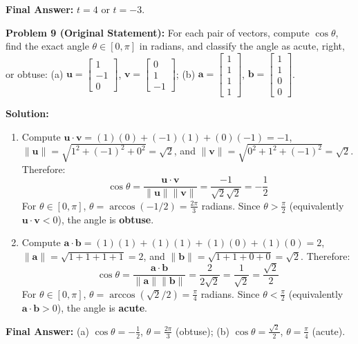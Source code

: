 \documentclass[11pt, letterpaper]{article}
\theoremstyle{definition}
\theoremstyle{remark}
\begin{document}
\textbf{Final Answer:} $t = 4$ or $t = -3$.

\medskip
\textbf{Problem 9 (Original Statement):} For each pair of vectors, compute $\cos\theta$, find the exact angle $\theta \in [0, \pi]$ in radians, and classify the angle as acute, right, or obtuse: (a) $\mathbf{u} = \begin{bmatrix} 1 \\ -1 \\ 0 \end{bmatrix}$, $\mathbf{v} = \begin{bmatrix} 0 \\ 1 \\ -1 \end{bmatrix}$; (b) $\mathbf{a} = \begin{bmatrix} 1 \\ 1 \\ 1 \\ 1 \end{bmatrix}$, $\mathbf{b} = \begin{bmatrix} 1 \\ 1 \\ 0 \\ 0 \end{bmatrix}$.

\textbf{Solution:}
\begin{enumerate}[label=(\alph*)]
    \item Compute $\mathbf{u} \cdot \mathbf{v} = (1)(0) + (-1)(1) + (0)(-1) = -1$, $\|\mathbf{u}\| = \sqrt{1^2 + (-1)^2 + 0^2} = \sqrt{2}$, and $\|\mathbf{v}\| = \sqrt{0^2 + 1^2 + (-1)^2} = \sqrt{2}$. Therefore:
    \[
    \cos\theta = \frac{\mathbf{u} \cdot \mathbf{v}}{\|\mathbf{u}\|\|\mathbf{v}\|} = \frac{-1}{\sqrt{2}\sqrt{2}} = -\frac{1}{2}
    \]
    For $\theta \in [0, \pi]$, $\theta = \arccos(-1/2) = \frac{2\pi}{3}$ radians. Since $\theta > \frac{\pi}{2}$ (equivalently $\mathbf{u} \cdot \mathbf{v} < 0$), the angle is \textbf{obtuse}.
    \item Compute $\mathbf{a} \cdot \mathbf{b} = (1)(1) + (1)(1) + (1)(0) + (1)(0) = 2$, $\|\mathbf{a}\| = \sqrt{1+1+1+1} = 2$, and $\|\mathbf{b}\| = \sqrt{1+1+0+0} = \sqrt{2}$. Therefore:
    \[
    \cos\theta = \frac{\mathbf{a} \cdot \mathbf{b}}{\|\mathbf{a}\|\|\mathbf{b}\|} = \frac{2}{2\sqrt{2}} = \frac{1}{\sqrt{2}} = \frac{\sqrt{2}}{2}
    \]
    For $\theta \in [0, \pi]$, $\theta = \arccos(\sqrt{2}/2) = \frac{\pi}{4}$ radians. Since $\theta < \frac{\pi}{2}$ (equivalently $\mathbf{a} \cdot \mathbf{b} > 0$), the angle is \textbf{acute}.
\end{enumerate}
\textbf{Final Answer:} (a) $\cos\theta = -\frac{1}{2}$, $\theta = \frac{2\pi}{3}$ (obtuse); (b) $\cos\theta = \frac{\sqrt{2}}{2}$, $\theta = \frac{\pi}{4}$ (acute).
\end{document}
